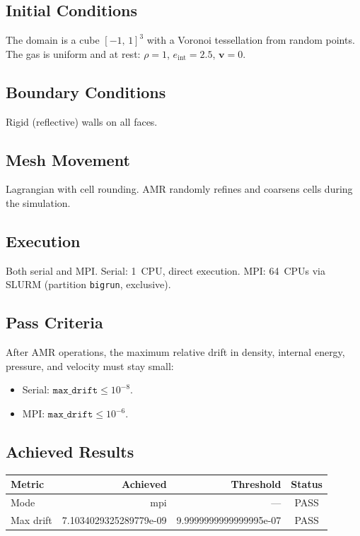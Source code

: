 \documentclass[11pt,a4paper]{article}
\begin{document}
\subsection*{Initial Conditions}
The domain is a cube $[-1,\,1]^3$ with a Voronoi tessellation from random points. The gas is uniform and at rest: $\rho = 1$, $e_{\mathrm{int}} = 2.5$, $\mathbf{v} = 0$.

\subsection*{Boundary Conditions}
Rigid (reflective) walls on all faces.

\subsection*{Mesh Movement}
Lagrangian with cell rounding. AMR randomly refines and coarsens cells during the simulation.

\subsection*{Execution}
Both serial and MPI. Serial: 1~CPU, direct execution. MPI: 64~CPUs via SLURM (partition \texttt{bigrun}, exclusive).

\subsection*{Pass Criteria}
After AMR operations, the maximum relative drift in density, internal energy, pressure, and velocity must stay small:
\begin{itemize}
  \item Serial: $\texttt{max\_drift} \le 10^{-8}$.
  \item MPI: $\texttt{max\_drift} \le 10^{-6}$.
\end{itemize}

\subsection*{Achieved Results}
\begin{table}[htbp]
\centering
\begin{tabular}{l r r c}
\toprule
\textbf{Metric} & \textbf{Achieved} & \textbf{Threshold} & \textbf{Status} \\
\midrule
Mode & mpi & --- & {\color{green!60!black}PASS} \\
Max drift & 7.1034029325289779e-09 & 9.9999999999999995e-07 & {\color{green!60!black}PASS} \\
\bottomrule
\end{tabular}
\end{table}
\end{document}

